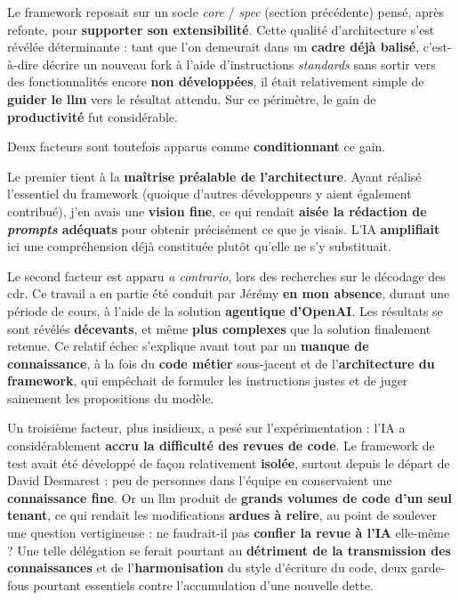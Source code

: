 Le framework reposait sur un socle \emph{core} / \emph{spec} (section
précédente) pensé, après refonte, pour \textbf{supporter son extensibilité}.
Cette qualité d'architecture s'est révélée déterminante : tant que l'on demeurait
dans un \textbf{cadre déjà balisé}, c'est-à-dire décrire un nouveau fork à l'aide
d'instructions \emph{standards} sans sortir vers des fonctionnalités encore
\textbf{non développées}, il était relativement simple de \textbf{guider le
\gls{llm}} vers le résultat attendu. Sur ce périmètre, le gain de
\textbf{productivité} fut considérable.

Deux facteurs sont toutefois apparus comme \textbf{conditionnant} ce gain.

Le premier tient à la \textbf{maîtrise préalable de l'architecture}. Ayant
réalisé l'essentiel du framework (quoique d'autres développeurs y aient
également contribué), j'en avais une \textbf{vision fine}, ce qui rendait
\textbf{aisée la rédaction de \emph{prompts} adéquats} pour obtenir précisément
ce que je visais. L'IA \textbf{amplifiait} ici une compréhension déjà constituée
plutôt qu'elle ne s'y substituait.

Le second facteur est apparu \emph{a contrario}, lors des recherches sur le
décodage des \gls{cdr}. Ce travail a en partie été conduit par Jérémy
\textbf{en mon absence}, durant une période de cours, à l'aide de la solution
\textbf{agentique d'OpenAI}. Les résultats se sont révélés \textbf{décevants},
et même \textbf{plus complexes} que la solution finalement retenue. Ce relatif
échec s'explique avant tout par un \textbf{manque de connaissance}, à la fois du
\textbf{code métier} sous-jacent et de l'\textbf{architecture du framework},
qui empêchait de formuler les instructions justes et de juger sainement les
propositions du modèle.

Un troisième facteur, plus insidieux, a pesé sur l'expérimentation : l'IA a
considérablement \textbf{accru la difficulté des revues de code}. Le framework de
test avait été développé de façon relativement \textbf{isolée}, surtout depuis le
départ de David Desmarest : peu de personnes dans l'équipe en conservaient une
\textbf{connaissance fine}. Or un \gls{llm} produit de \textbf{grands volumes de
code d'un seul tenant}, ce qui rendait les modifications \textbf{ardues à
relire}, au point de soulever une question vertigineuse : ne faudrait-il pas
\textbf{confier la revue à l'IA} elle-même ? Une telle délégation se ferait
pourtant au \textbf{détriment de la transmission des connaissances} et de
l'\textbf{harmonisation} du style d'écriture du code, deux garde-fous pourtant
essentiels contre l'accumulation d'une nouvelle dette.

